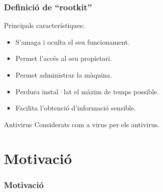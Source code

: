 \documentclass{beamer}
\begin{document}
\begin{frame}
	\frametitle{Definició de ``rootkit''}
	\begin{block}{Principals característiques:}
		\begin{itemize}
			\item<1-> S'amaga i oculta el seu funcionament.
			\item<2-> Permet l'accés al seu propietari.
			\item<3-> Permet administrar la màquina.
			\item<4-> Perdura instal·lat el màxim de temps possible.
			\item<5-> Facilita l'obtenció d'informació sensible.
		\end{itemize}
	\end{block}
	\begin{block}{Antivirus}
		Considerats com a virus per els antivirus.
	\end{block}
\end{frame}





\section{Motivació}
\begin{frame}
	\frametitle{Motivació}
\end{frame}
\end{document}
